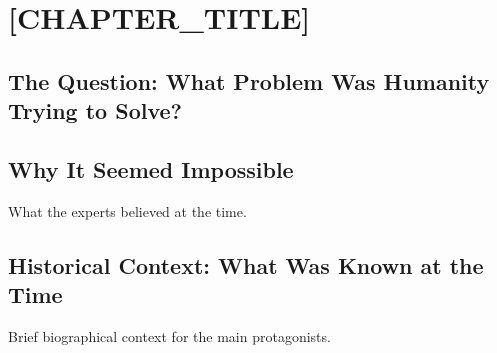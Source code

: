 
\let\LocalMacro\relax
\newcommand{\LocalMacro}{...}

\chapter{[CHAPTER_TITLE]}
\label{ch:[CHAPTER_LABEL]}

\section{The Question: What Problem Was Humanity Trying to Solve?}
\label{sec:[CHAPTER_LABEL]:question}


\section{Why It Seemed Impossible}
\label{sec:[CHAPTER_LABEL]:impossible}


What the experts believed at the time.

\section{Historical Context: What Was Known at the Time}
\label{sec:[CHAPTER_LABEL]:context}


Brief biographical context for the main protagonists.

